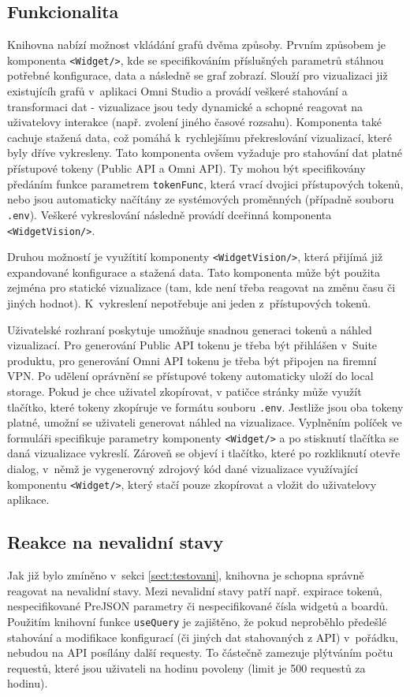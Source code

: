 \documentclass[czech, bc, kiv, he, iso690numb]{fasthesis}
\begin{document}
\subsection{Funkcionalita}
Knihovna nabízí možnost vkládání grafů dvěma způsoby. Prvním způsobem je komponenta \texttt{<Widget/>}, kde se specifikováním příslušných parametrů stáhnou potřebné konfigurace, data
a následně se graf zobrazí. Slouží pro vizualizaci již existujícíh grafů v~aplikaci Omni Studio a provádí veškeré stahování a transformaci dat - vizualizace jsou tedy dynamické
a schopné reagovat na uživatelovy interakce (např. zvolení jiného časové rozsahu). Komponenta také cachuje stažená data, což pomáhá k~rychlejšímu překreslování vizualizací,
které byly dříve vykresleny. Tato komponenta ovšem vyžaduje pro stahování dat platné přístupové tokeny (Public API a Omni API). Ty mohou být specifikovány
předáním funkce parametrem \texttt{tokenFunc}, která vrací dvojici přístupových tokenů, nebo jsou automaticky načítány ze systémových proměnných (případně souboru \texttt{.env}). Veškeré
vykreslování následně provádí dceřinná komponenta \texttt{<WidgetVision/>}.

Druhou možností je využítití komponenty \texttt{<WidgetVision/>}, která přijímá již expandované konfigurace a stažená data. Tato komponenta může být použita
zejména pro statické vizualizace (tam, kde není třeba reagovat na změnu času či jiných hodnot). K~vykreslení nepotřebuje ani jeden z~přístupových tokenů. 

Uživatelské rozhraní poskytuje umožňuje snadnou generaci tokenů a náhled vizualizací. Pro generování Public API tokenu je třeba být přihlášen v~Suite produktu, pro
generování Omni API tokenu je třeba být připojen na firemní VPN. Po udělení oprávnění se přístupové tokeny automaticky uloží do local storage. Pokud je chce uživatel zkopírovat,
v patičce stránky může využít tlačítko, které tokeny zkopíruje ve formátu souboru \texttt{.env}. Jestliže jsou oba tokeny platné, umožní se uživateli generovat náhled na vizualizace.
Vyplněním políček ve formuláři specifikuje parametry komponenty \texttt{<Widget/>} a po stisknutí tlačítka se daná vizualizace vykreslí. Zároveň se objeví i tlačítko, které po rozkliknutí
otevře dialog, v~němž je vygenerovný zdrojový kód dané vizualizace využívající komponentu \texttt{<Widget/>}, který stačí pouze zkopírovat a vložit do uživatelovy aplikace.

\subsection{Reakce na nevalidní stavy}
Jak již bylo zmíněno v~sekci \ref{sect:testovani}, knihovna je schopna správně reagovat na nevalidní stavy. Mezi nevalidní stavy patří např. expirace tokenů,
nespecifikované PreJSON parametry či nespecifikované čísla widgetů a boardů. Použitím knihovní funkce \texttt{useQuery} je zajištěno, že pokud neproběhlo předešlé stahování
a modifikace konfigurací (či jiných dat stahovaných z API) v~pořádku, nebudou na API posílány další requesty. To částečně zamezuje plýtváním počtu requestů, které jsou uživateli
na hodinu povoleny (limit je 500 requestů za hodinu).
\end{document}
